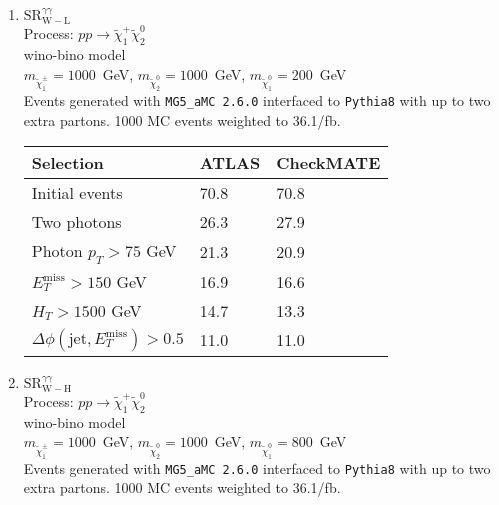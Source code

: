 \documentclass[12pt,fleqn]{article}
\begin{document}
\begin{enumerate}
\newpage
\item{$\mathrm{SR}^{\gamma\gamma}_{\mathrm{W-L}}$\\}
 Process: $ p p \to \tilde{\chi}^+_1 \tilde{\chi}^0_2$\\
 wino-bino model\\
 $m_{\tilde{\chi}_1^\pm} = 1000$~GeV, $m_{\tilde{\chi}_2^0} = 1000$~GeV, $m_{\tilde{\chi}_1^0} = 200$~GeV\\
 Events generated with \texttt{MG5\_aMC 2.6.0} interfaced to \texttt{Pythia8} with up to two extra partons.
 1000 MC events weighted to 36.1/fb.
\begin{table}[h!] 
 \renewcommand*{\arraystretch}{1.2}
 \begin{tabular}{l|p{3cm}|p{3cm}} \toprule
  Selection                                                                       & ATLAS    & CheckMATE       \\ \midrule
  Initial events                                                                  & 70.8     &  70.8          \\
  Two photons                                                                     & 26.3     &  27.9 \\
  Photon $p_T>75$ GeV                                                             & 21.3     &  20.9 \\
  $E_T^\mathrm{miss} > 150$ GeV                                                   & 16.9     &  16.6 \\
  $H_T > 1500$ GeV                                                                & 14.7     &  13.3  \\ 
  $\Delta\phi(\mathrm{jet},E_T^\mathrm{miss}) > 0.5$                              & 11.0     &  11.0  \\ \bottomrule
 \end{tabular}
\end{table} 

\item{$\mathrm{SR}^{\gamma\gamma}_{\mathrm{W-H}}$\\}
 Process: $ p p \to \tilde{\chi}^+_1 \tilde{\chi}^0_2$\\
 wino-bino model\\
 $m_{\tilde{\chi}_1^\pm} = 1000$~GeV, $m_{\tilde{\chi}_2^0} = 1000$~GeV, $m_{\tilde{\chi}_1^0} = 800$~GeV\\
 Events generated with \texttt{MG5\_aMC 2.6.0} interfaced to \texttt{Pythia8} with up to two extra partons.
 1000 MC events weighted to 36.1/fb.


\end{enumerate}
\end{document}

